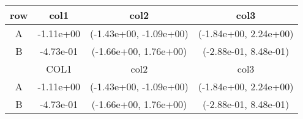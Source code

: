 \begin{tabular}{cccc}
\toprule
row&col1&col2&col3\tabularnewline
\midrule
A&-1.11e+00& (-1.43e+00, -1.09e+00)& (-1.84e+00, 2.24e+00)\tabularnewline
B&-4.73e-01& (-1.66e+00, 1.76e+00)& (-2.88e-01, 8.48e-01)\tabularnewline
\midrule
&COL1&col2&col3\tabularnewline
\midrule
A&-1.11e+00& (-1.43e+00, -1.09e+00)& (-1.84e+00, 2.24e+00)\tabularnewline
B&-4.73e-01& (-1.66e+00, 1.76e+00)& (-2.88e-01, 8.48e-01)\tabularnewline
\bottomrule
\end{tabular}

